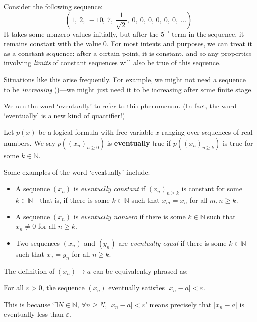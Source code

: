 Consider the following sequence:
\[ \left( 1,~ 2,~ -10,~ 7,~ \frac{1}{\sqrt{2}},~ 0,~ 0,~ 0,~ 0,~ 0,~ 0,~ \dots \right) \]
It takes some nonzero values initially, but after the $5^{\text{th}}$ term in the sequence, it remains constant with the value $0$. For most intents and purposes, we can treat it as a constant sequence: after a certain point, it is constant, and so any properties involving \textit{limits} of constant sequences will also be true of this sequence.

Situations like this arise frequently. For example, we might not need a sequence to be \textit{increasing} ()---we might just need it to be increasing after some finite stage.

We use the word `eventually' to refer to this phenomenon. (In fact, the word `eventually' is a new kind of quantifier!)

\begin{definition}
\label{defEventually}
Let $p(x)$ be a logical formula with free variable $x$ ranging over sequences of real numbers. We say $p((x_n)_{n \ge 0})$ is \textbf{eventually} true if $p((x_n)_{n \ge k})$ is true for some $k \in \mathbb{N}$.
\end{definition}

\begin{example}
Some examples of the word `eventually' include:
\begin{itemize}
\item A sequence $(x_n)$ is \textit{eventually constant} if $(x_n)_{n \ge k}$ is constant for some $k \in \mathbb{N}$---that is, if there is some $k \in \mathbb{N}$ such that $x_m = x_n$ for all $m,n \ge k$.

\item A sequence $(x_n)$ is \textit{eventually nonzero} if there is some $k \in \mathbb{N}$ such that $x_n \ne 0$ for all $n \ge k$.

\item Two sequences $(x_n)$ and $(y_n)$ are \textit{eventually equal} if there is some $k \in \mathbb{N}$ such that $x_n = y_n$ for all $n \ge k$.
\end{itemize}
\end{example}

\begin{example}
\label{exConvergenceEssentially}
The definition of $(x_n) \to a$ can be equivalently phrased as:
\begin{center}
For all $\varepsilon > 0$, the sequence $(x_n)$ eventually satisfies $|x_n - a| < \varepsilon$.
\end{center}
This is because `$\exists N \in \mathbb{N},\, \forall n \ge N,\, |x_n - a| < \varepsilon$' means precisely that $|x_n - a|$ is eventually less than $\varepsilon$.
\end{example}

